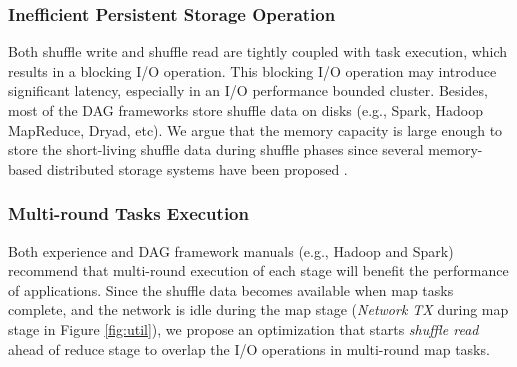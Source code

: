 {\subsubsection{Inefficient Persistent Storage Operation}
Both shuffle write and shuffle read are tightly coupled with task execution, which results in a blocking I/O operation.
This blocking I/O operation may introduce significant latency, especially in an I/O performance bounded cluster.
Besides, most of the DAG frameworks store shuffle data on disks (e.g., Spark, Hadoop MapReduce, Dryad, etc).
We argue that the memory capacity is large enough to store the short-living shuffle data during shuffle phases since several memory-based distributed storage systems have been proposed \cite{tachyon, ramcloud}.


\subsubsection{Multi-round Tasks Execution}\label{multi}
Both experience and DAG framework manuals (e.g., Hadoop and Spark) recommend that multi-round execution of each stage will benefit the performance of applications.
Since the shuffle data becomes available when map tasks complete, 
and the network is idle during the map stage (\textit{Network TX} during map stage in Figure \ref{fig:util}), 
we propose an optimization that starts \textit{shuffle read} ahead of reduce stage to overlap the I/O operations in multi-round map tasks. 
}
